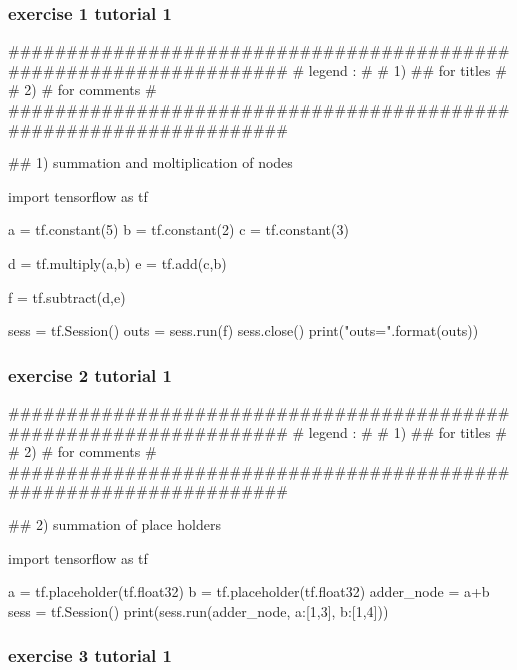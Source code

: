 \documentclass[11pt]{article}
\begin{document}
\subsubsection{exercise 1  tutorial 1}
\begin{python}
###################################################################
# legend :                                                        #
#         1) ## for titles                                        #
#         2) #  for comments                                      #
###################################################################  

## 1) summation and moltiplication of nodes

import tensorflow as tf

a = tf.constant(5)
b = tf.constant(2)
c = tf.constant(3)

d = tf.multiply(a,b)
e = tf.add(c,b)

f = tf.subtract(d,e)

sess = tf.Session()
outs = sess.run(f)
sess.close()
print("outs={}".format(outs))
\end{python}
\clearpage
\subsubsection{exercise 2  tutorial 1}
\begin{python}

###################################################################
# legend :                                                        #
#         1) ## for titles                                        #
#         2) #  for comments                                      #
###################################################################    

## 2) summation of place holders

import tensorflow as tf

a = tf.placeholder(tf.float32)
b = tf.placeholder(tf.float32)
adder_node = a+b
sess = tf.Session()
print(sess.run(adder_node, {a:[1,3], b:[1,4]}))
\end{python}

\subsubsection{exercise 3  tutorial 1}
\end{document}

